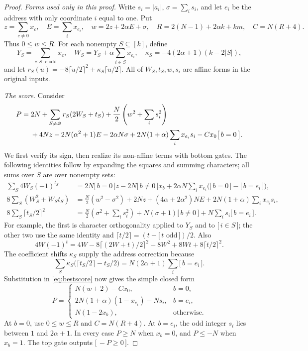 \documentclass[11pt,letterpaper]{article}
\theoremstyle{remark}
\newcommand{\ind}[1]{\bigl[\,#1\,\bigr]}
\begin{document}
\begin{proof}
\emph{Forms used only in this proof.}
Write $s_i=|a_i|$, $\sigma=\sum_i s_i$, and let $e_i$ be the address with
only coordinate $i$ equal to one. Put
\[
z=\sum_{c\ne0}x_c,\quad E=\sum_i x_{e_i},\quad
w=2z+2\alpha E+\sigma,\quad R=2(N-1)+2\alpha k+km,\quad C=N(R+4).
\]
Thus $0\le w\le R$. For each nonempty $S\subseteq[k]$, define
\[
Y_S=\sum_{c:S\cdot c\text{ odd}}x_c,\quad
W_S=Y_S+\alpha\sum_{i\in S}x_{e_i},\quad
\kappa_S=-4(2\alpha+1)(k-2|S|),
\]
and let $r_S(u)=-8\lceil u/2\rceil^2+\kappa_S\lceil u/2\rceil$.
All of $W_S,t_S,w,s_i$ are affine forms in the original inputs.

\emph{The score.} Consider
\begin{align}\label{eq:bestscore}
P={}&2N+\sum_{S\ne\varnothing}r_S(2W_S+t_S)
 +\frac N2\left(w^2+\sum_i s_i^2\right)\notag\\
 &+4Nz-2N(\alpha^2+1)E-2\alpha N\sigma
 +2N(1+\alpha)\sum_i x_{e_i}s_i-Cx_0\ind{b=0}.
\end{align}
We first verify its sign, then realize its non-affine terms with bottom gates.
The following identities follow by expanding the squares and summing
characters; all sums over $S$ are over nonempty sets:
\begin{align*}
\sum_S4W_S(-1)^{t_S}
 &=2N\ind{b=0}z-2N\ind{b\ne0}x_b
   +2\alpha N\sum_i x_{e_i}\bigl(\ind{b=0}-\ind{b=e_i}\bigr),\\
8\sum_S(W_S^2+W_St_S)
 &=\frac N2(w^2-\sigma^2)+2Nz+(4\alpha+2\alpha^2)NE
   +2N(1+\alpha)\sum_i x_{e_i}s_i,\\
8\sum_S\lceil t_S/2\rceil^2
 &=\frac N2\left(\sigma^2+\sum_i s_i^2\right)
   +N(\sigma+1)\ind{b\ne0}+N\sum_i s_i\ind{b=e_i}.
\end{align*}
For example, the first is character orthogonality applied to $Y_S$ and to
$\ind{i\in S}$; the other two use the same identity and
$\lceil t/2\rceil=(t+\ind{t\text{ odd}})/2$.
Also
\[
4W(-1)^t=4W-8\lceil(2W+t)/2\rceil^2+8W^2+8Wt+8\lceil t/2\rceil^2.
\]
The coefficient shifts $\kappa_S$ supply the address correction because
\[
\sum_S\kappa_S\bigl(\lceil t_S/2\rceil-t_S/2\bigr)
 =N(2\alpha+1)\sum_i\ind{b=e_i}.
\]
Substitution in \eqref{eq:bestscore} now gives the simple closed form
\begin{equation}\label{eq:bestclosed}
P=\begin{cases}
N(w+2)-Cx_0,&b=0,\\
2N(1+\alpha)(1-x_{e_i})-Ns_i,&b=e_i,\\
N(1-2x_b),&\text{otherwise}.
\end{cases}
\end{equation}
At $b=0$, use $0\le w\le R$ and $C=N(R+4)$. At $b=e_i$, the odd
integer $s_i$ lies between $1$ and $2\alpha+1$. In every case $P\ge N$
when $x_b=0$, and $P\le-N$ when $x_b=1$. The top gate outputs $\ind{-P\ge0}$.


\end{proof}
\end{document}
